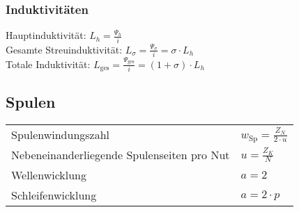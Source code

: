 \begin{sectionbox}
\subsubsection{Induktivitäten}
Hauptinduktivität: $L_h=\frac{\Psi_h}{i}$\\
Gesamte Streuinduktivität: $L_{\sigma}=\frac{\Psi_\sigma}{i}=\sigma \cdot L_h$ \\
Totale Induktivität: $L_\text{ges}= \frac{\Psi_\text{ges}}{i}=(1+\sigma) \cdot L_h$
\end{sectionbox}

\begin{sectionbox}
\subsection{Spulen}
\begin{tabularx}{\columnwidth}{lX}
Spulenwindungszahl & $w_\text{Sp} = \frac{Z_N}{2 \cdot u}$\\
Nebeneinanderliegende Spulenseiten pro Nut & $u = \frac{Z_K}{N}$\\
Wellenwicklung & $a = 2$\\
Schleifenwicklung & $a = 2\cdot p$
\end{tabularx}
\end{sectionbox}


